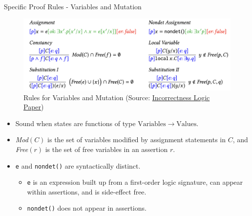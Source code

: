 \documentclass[
  10pt,
  ignorenonframetext,
]{beamer}
\providecommand{\tightlist}{%
  \setlength{\itemsep}{0pt}\setlength{\parskip}{0pt}}
\newcommand{\Vars}{\mathrm{Variables}}
\newcommand{\Vals}{\mathrm{Values}}
\begin{document}
\begin{frame}[fragile]{Specific Proof Rules - Variables and Mutation}
\label{specific-proof-rules---variables-and-mutation}
\begin{figure}
\centering
\includegraphics[width=\textwidth,height=0.3\textheight]{images/specific.png}
\caption{Rules for Variables and Mutation (Source:
\href{https://dl.acm.org/doi/10.1145/3371078}{Incorrectness Logic
Paper})}
\end{figure}

\begin{itemize}
\item
  Sound when states are functions of type \(\Vars \to \Vals\).
\item
  \emph{Mod}\((C)\) is the set of variables modified by assignment
  statements in \(C\), and \emph{Free}\((r)\) is the set of free
  variables in an assertion \(r\).
\item
  \texttt{e} and \texttt{nondet()} are syntactically distinct.

  \begin{itemize}
  \tightlist
  \item
    \texttt{e} is an expression built up from a first-order logic
    signature, can appear within assertions, and is side-effect free.
  \item
    \texttt{nondet()} does not appear in assertions.
  \end{itemize}
\end{itemize}
\end{frame}
\end{document}
